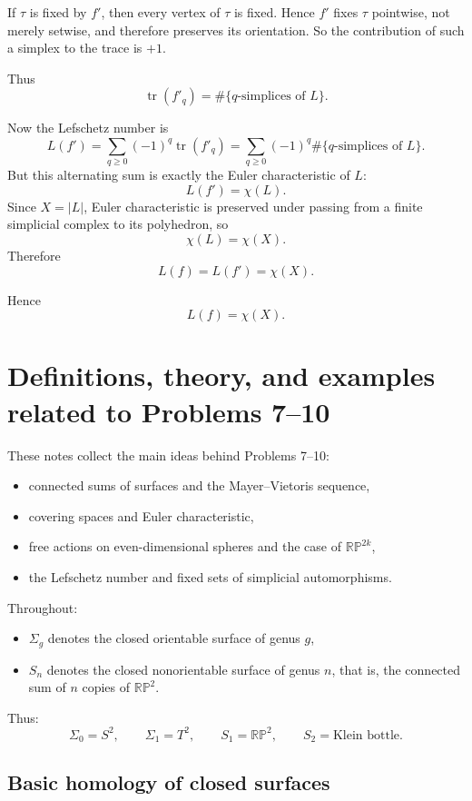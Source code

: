 \documentclass[12pt,a4paper]{article}
\newcommand{\RP}{\mathbb{RP}}
\theoremstyle{notespace}
\begin{document}
If \(\tau\) is fixed by \(f'\), then every vertex of \(\tau\) is fixed. Hence \(f'\) fixes \(\tau\) pointwise, not merely setwise, and therefore preserves its orientation. So the contribution of such a simplex to the trace is \(+1\).

Thus
\[
\operatorname{tr}(f'_q)=\#\{\text{\(q\)-simplices of }L\}.
\]

Now the Lefschetz number is
\[
L(f')=\sum_{q\ge 0}(-1)^q \operatorname{tr}(f'_q)
=\sum_{q\ge 0}(-1)^q \#\{\text{\(q\)-simplices of }L\}.
\]
But this alternating sum is exactly the Euler characteristic of \(L\):
\[
L(f')=\chi(L).
\]
Since \(X=|L|\), Euler characteristic is preserved under passing from a finite simplicial complex to its polyhedron, so
\[
\chi(L)=\chi(X).
\]
Therefore
\[
L(f)=L(f')=\chi(X).
\]

Hence
\[
\boxed{L(f)=\chi(X).}
\]



	
	\section{Definitions, theory, and examples related to Problems 7--10}
	
	These notes collect the main ideas behind Problems 7--10:
	\begin{itemize}[leftmargin=2em]
		\item connected sums of surfaces and the Mayer--Vietoris sequence,
		\item covering spaces and Euler characteristic,
		\item free actions on even-dimensional spheres and the case of $\RP^{2k}$,
		\item the Lefschetz number and fixed sets of simplicial automorphisms.
	\end{itemize}
	
	Throughout:
	\begin{itemize}[leftmargin=2em]
		\item $\Sigma_g$ denotes the closed orientable surface of genus $g$,
		\item $S_n$ denotes the closed nonorientable surface of genus $n$, that is, the connected sum of $n$ copies of $\RP^2$.
	\end{itemize}
	
	Thus:
	\[
	\Sigma_0=S^2,\qquad \Sigma_1=T^2,\qquad S_1=\RP^2,\qquad S_2=\text{Klein bottle}.
	\]
	
	\subsection*{Basic homology of closed surfaces}
	
\end{document}
